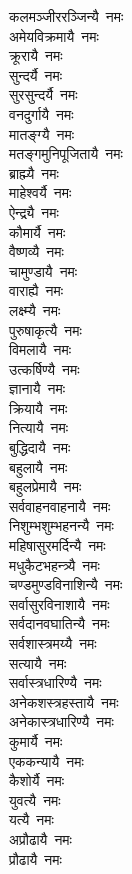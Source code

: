 \begin{multicols}{2}
\begin{flushleft}
कलमञ्जीररञ्जिन्यै~नमः\\
अमेयविक्रमायै~नमः\\
क्रूरायै~नमः\\
सुन्दर्यै~नमः\\
सुरसुन्दर्यै~नमः\\
वनदुर्गायै~नमः\\
मातङ्ग्यै~नमः\\
मतङ्गमुनिपूजितायै~नमः\hfill{}\\
ब्राह्म्यै~नमः\\
माहेश्वर्यै~नमः\\
ऐन्द्र्यै~नमः\\
कौमार्यै~नमः\\
वैष्णव्यै~नमः\\
चामुण्डायै~नमः\\
वाराह्यै~नमः\\
लक्ष्म्यै~नमः\\
पुरुषाकृत्यै~नमः\\
विमलायै~नमः\hfill{}\\
उत्कर्षिण्यै~नमः\\
ज्ञानायै~नमः\\
क्रियायै~नमः\\
नित्यायै~नमः\\
बुद्धिदायै~नमः\\
बहुलायै~नमः\\
बहुलप्रेमायै~नमः\\
सर्ववाहनवाहनायै~नमः\\
निशुम्भशुम्भहनन्यै~नमः\\
महिषासुरमर्दिन्यै~नमः\hfill{}\\
मधुकैटभहन्त्र्यै~नमः\\
चण्डमुण्डविनाशिन्यै~नमः\\
सर्वासुरविनाशायै~नमः\\
सर्वदानवघातिन्यै~नमः\\
सर्वशास्त्रमय्यै~नमः\\
सत्यायै~नमः\\
सर्वास्त्रधारिण्यै~नमः\\
अनेकशस्त्रहस्तायै~नमः\\
अनेकास्त्रधारिण्यै~नमः\\
कुमार्यै~नमः\hfill{}\\
एककन्यायै~नमः\\
कैशोर्यै~नमः\\
युवत्यै~नमः\\
यत्यै~नमः\\
अप्रौढायै~नमः\\
प्रौढायै~नमः\\

\end{flushleft}
\end{multicols}
